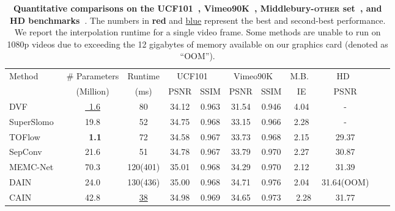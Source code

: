 \documentclass[10pt,twocolumn,letterpaper]{article}
\def\red#1{\textcolor{MyRed}{#1}}
\def\blue#1{\textcolor{MyBlue}{#1}}
\def\first#1{\red{\textbf{#1}}}
\def\second#1{\blue{\underline{#1}}}
\begin{document}
\begin{table*}
\centering
	\caption{
		\textbf{Quantitative comparisons on the UCF101~\cite{soomro2012ucf101}, Vimeo90K~\cite{xue2019video}, Middlebury-\textsc{other} set~\cite{baker2011database}, and HD benchmarks~\cite{bao2019memc}}. The numbers in \first{red} and \second{blue} represent the best and second-best performance. We report the interpolation runtime for a single  video frame. Some methods are unable to run on 1080p videos due to exceeding the 12 gigabytes of memory available on our graphics card (denoted as “OOM”).
	}
	\label{tab:UCF101_Vimeo90K_MB}
	\begin{tabular}{lcccccccccc}
		\toprule
\multirow{2}{*}[-0.28em]{Method}  &\# Parameters&
		Runtime
&\multicolumn{2}{c}{UCF101~\cite{soomro2012ucf101}} &\multicolumn{2}{c}{Vimeo90K~\cite{xue2019video}} & M.B.~\cite{baker2011database} & ~~HD~~\cite{bao2019memc}~\\


		
		\cmidrule(l{7pt}r{7pt}){4-5}
		\cmidrule(l{7pt}r{7pt}){6-7}
		\cmidrule(l{5pt}r{5pt}){8-8}
		\cmidrule(l{5pt}r{5pt}){9-9}
\vspace{0.2em}
		&(Million) & (ms) &PSNR & SSIM 	&PSNR & SSIM & IE & PSNR\\
		\addlinespace[-1pt]
		\midrule
		DVF~\cite{liu2017video}&\second{~1.6}&80&34.12&0.963&31.54&0.946&4.04& - \\
		
		SuperSlomo~\cite{jiang2018super, choi2020channel} & 19.8 & {52} & 34.75 & {0.968} & {33.15} & 0.966 & 2.28 & -
		
		\\\hline \hline
		TOFlow~\cite{xue2019video}&\first{~1.1} &72 & 34.58 & 0.967  &33.73& 0.968 &2.15 &29.37  \\
		
		SepConv~\cite{Niklaus_ICCV_2017} & 21.6 & 51 & 34.78 & 0.967  &33.79& {0.970} &2.27& 30.87
		
		\\MEMC-Net~\cite{bao2019memc} & 70.3 & 120(401) & {35.01} & {0.968} &{34.29}& {0.970}  &{2.12} & 31.39  \\ 

		DAIN~\cite{bao2019depth} & 24.0 & 130(436) & {35.00} & {0.968} &{34.71}& {0.976}  &2.04 & 31.64(OOM)\\ 

		CAIN~\cite{choi2020channel} & 42.8 & \second{38} & 34.98 & {0.969} & 34.65 & 0.973 & ~2.28 & 31.77\\
		

\end{tabular}
\end{table*}
\end{document}

